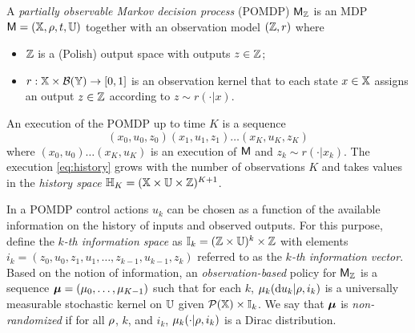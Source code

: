 \documentclass{ifacconf}
\begin{document}
\begin{definition}
\label{def:POMDP}

A \emph{partially observable Markov decision process} (POMDP) $\mathsf{M}_{{\mathbb{Z}}}$ is an MDP $\mathsf{M} = ({\mathbb{X}}, \rho, t, {\mathbb{U}})$ together with an observation model $({\mathbb{Z}}, r)$ where
\begin{itemize}
	\item ${\mathbb{Z}}$ is a (Polish) output space with outputs $z \in {\mathbb{Z}}$;
  \item $r : {\mathbb{X}} \times \mathcal B({\mathbb{Y}}) \rightarrow [0,1]$ is an observation kernel that to each state $x \in {\mathbb{X}}$ assigns an output $z \in {\mathbb{Z}}$ according to $z\sim r(\cdot|x)$.
\end{itemize}
\end{definition}

An execution of the POMDP up to time $K$ is a sequence
\begin{equation}
\label{eq:history}
  (x_0,u_0,z_0) (x_1,u_1,z_1) \ldots (x_K,u_K,z_K)
\end{equation}
where $(x_0, u_0) \ldots (x_K, u_K)$ is an execution of $\mathsf{M}$ and $z_k \sim r(\cdot | x_k)$. The execution \eqref{eq:history} grows with the number of observations $K$ and takes values in the \emph{history space} ${\mathbb{H}}_K = ({\mathbb{X}} \times {\mathbb{U}} \times {\mathbb{Z}})^{K+1}$.

In a POMDP control actions $u_k$ can be chosen as a function of the available information on the history of inputs and observed outputs. For this purpose, define the \emph{$k$-th information space} as ${\mathbb{I}}_k = ({\mathbb{Z}} \times {\mathbb{U}})^{k} \times {\mathbb{Z}}$ with elements $i_k = (z_0,u_0,z_1,u_1,\ldots,z_{k-1}, u_{k-1}, z_k)$ referred to as the \emph{$k$-th information vector}. Based on the notion of information, an \emph{observation-based} policy for $\mathsf{M}_{{\mathbb{Z}}}$ is a sequence ${\boldsymbol{\mu}}=({\mu}_0,\ldots,{\mu}_{K-1})$ such that for each $k$, ${\mu}_k( \mathrm{d} u_k|\rho, i_k)$ is a universally measurable stochastic kernel on ${\mathbb{U}}$  given $\mathcal{P}({\mathbb{X}})\times {\mathbb{I}}_k$. We say that ${\boldsymbol{\mu}}$ is \emph{non-randomized} if for all $\rho$, $k$, and $i_k$, ${\mu}_k(\cdot|\rho, i_k)$ is a Dirac distribution. %
\end{document}
